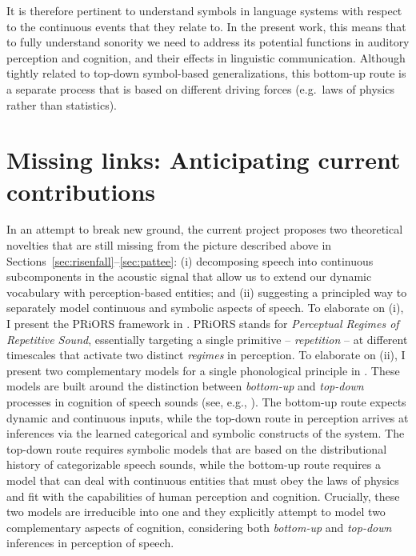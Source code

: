 It is therefore pertinent to understand symbols in language systems with respect to the continuous events that they relate to. In the present work, this means that to fully understand sonority we need to address its potential functions in auditory perception and cognition, and their effects in linguistic communication. Although tightly related to top-down symbol-based generalizations, this bottom-up route is a separate process that is based on different driving forces (e.g.~laws of physics rather than statistics).

\section{Missing links: Anticipating current contributions}\label{sec:missinglinks}

In an attempt to break new ground, the current project proposes two theoretical novelties that are still missing from the picture described above in Sections~\ref{sec:risenfall}--\ref{sec:pattee}:
(i) decomposing speech into continuous subcomponents in the acoustic signal that allow us to extend our dynamic vocabulary with perception-based entities; and
(ii) suggesting a principled way to separately model continuous and symbolic aspects of speech.
To elaborate on (i), I present the PRiORS framework in . PRiORS stands for \emph{Perceptual Regimes of Repetitive Sound}, essentially targeting a single primitive -- \emph{repetition} -- at different timescales that activate two distinct \emph{regimes} in perception.
To elaborate on (ii), I present two complementary models for a single phonological principle in . These models are built around the distinction between \emph{bottom-up} and \emph{top-down} processes in cognition of speech sounds (see, e.g., \citealt{klatt1979speech, fowler1986event}).
The bottom-up route expects dynamic and continuous inputs, while the top-down route in perception arrives at inferences via the learned categorical and symbolic constructs of the system.
The top-down route requires symbolic models that are based on the distributional history of categorizable speech sounds, while the bottom-up route requires a model that can deal with continuous entities that must obey the laws of physics and fit with the capabilities of human perception and cognition.
Crucially, these two models are irreducible into one and they explicitly attempt to model two complementary aspects of cognition, considering both \emph{bottom-up} and \emph{top-down} inferences in perception of speech.
